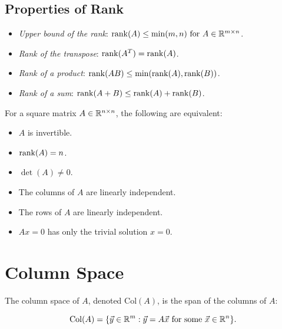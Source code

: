 \subsection{Properties of Rank}

\begin{itemize}

    \item \emph{Upper bound of the rank}: \(\mathrm{rank}(A) \leq \min(m,n) \text{ for } A \in \mathbb{R}^{m \times n}\).

    \item \emph{Rank of the transpose}: \(\mathrm{rank}(A^T) = \mathrm{rank}(A)\).

    \item \emph{Rank of a product}: \(\mathrm{rank}(AB) \leq \min(\mathrm{rank}(A), \mathrm{rank}(B))\).

    \item \emph{Rank of a sum}: \(\mathrm{rank}(A+B) \leq \mathrm{rank}(A) + \mathrm{rank}(B)\).

\end{itemize}

For a square matrix \(A \in \mathbb{R}^{n \times n}\), the following are equivalent:

\begin{itemize}

    \item \(A\) is invertible.

    \item \(\mathrm{rank}(A) = n\).

    \item \(\det(A) \neq 0\).

    \item The columns of \(A\) are linearly independent.

    \item The rows of \(A\) are linearly independent.

    \item \(Ax = 0\) has only the trivial solution \(x = 0\).

\end{itemize}

\section{Column Space}

The column space of \(A\), denoted \(\text{Col}(A)\), is the span of the columns of \(A\):

\[
    \mathrm{Col}(A) = \{\vec{y} \in \mathbb{R}^m : \vec{y} = A\vec{x} \text{ for some } \vec{x} \in \mathbb{R}^n\}.
\]

